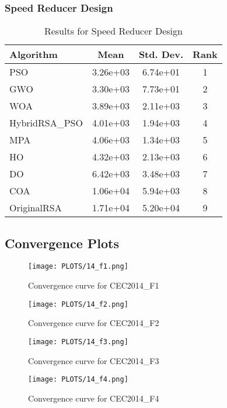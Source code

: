 \documentclass[12pt]{article}
\begin{document}
\subsubsection{Speed Reducer Design}
\begin{table}[H]
\centering
\caption{Results for Speed Reducer Design}
\begin{tabular}{|l|c|c|c|}
\hline
\textbf{Algorithm} & \textbf{Mean} & \textbf{Std. Dev.} & \textbf{Rank} \\
\hline
PSO & 3.26e+03 & 6.74e+01 & 1 \\
GWO & 3.30e+03 & 7.73e+01 & 2 \\
WOA & 3.89e+03 & 2.11e+03 & 3 \\
HybridRSA\_PSO & 4.01e+03 & 1.94e+03 & 4 \\
MPA & 4.06e+03 & 1.34e+03 & 5 \\
HO & 4.32e+03 & 2.13e+03 & 6 \\
DO & 6.42e+03 & 3.48e+03 & 7 \\
COA & 1.06e+04 & 5.94e+03 & 8 \\
OriginalRSA & 1.71e+04 & 5.20e+04 & 9 \\
\hline
\end{tabular}
\end{table}

\subsection{Convergence Plots}
\begin{figure}[H]
    \centering
    \texttt{[image: PLOTS/14\_f1.png]}
    \caption{Convergence curve for CEC2014\_F1}
    \label{fig:conv_cec2014_f1}
\end{figure}

\begin{figure}[H]
    \centering
    \texttt{[image: PLOTS/14\_f2.png]}
    \caption{Convergence curve for CEC2014\_F2}
    \label{fig:conv_cec2014_f2}
\end{figure}

\begin{figure}[H]
    \centering
    \texttt{[image: PLOTS/14\_f3.png]}
    \caption{Convergence curve for CEC2014\_F3}
    \label{fig:conv_cec2014_f3}
\end{figure}

\begin{figure}[H]
    \centering
    \texttt{[image: PLOTS/14\_f4.png]}
    \caption{Convergence curve for CEC2014\_F4}
    \label{fig:conv_cec2014_f4}
\end{figure}
\end{document}
